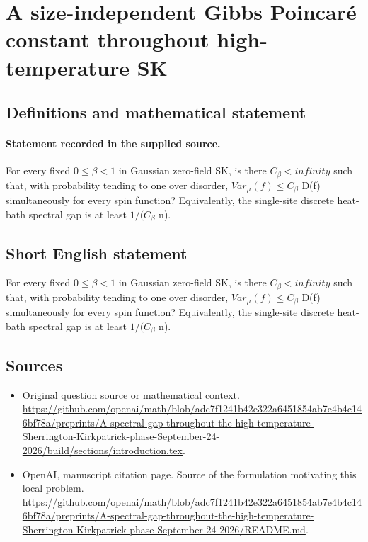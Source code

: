 \documentclass[11pt]{article}
\begin{document}
\section*{A size-independent Gibbs Poincaré constant throughout high-temperature SK}\label{statement}
\subsection{Definitions and mathematical statement}
\paragraph{Statement recorded in the supplied source.}
For every fixed $0\leq \beta <1$ in Gaussian zero-field SK, is there $C_\beta <infinity$ such that, with probability tending to one over disorder, $Var_\mu (f)\leq C_\beta $ D(f) simultaneously for every spin function? Equivalently, the single-site discrete heat-bath spectral gap is at least $1/(C_\beta $ n).
\subsection{Short English statement}
For every fixed $0\leq \beta <1$ in Gaussian zero-field SK, is there $C_\beta <infinity$ such that, with probability tending to one over disorder, $Var_\mu (f)\leq C_\beta $ D(f) simultaneously for every spin function? Equivalently, the single-site discrete heat-bath spectral gap is at least $1/(C_\beta $ n).
\subsection{Sources}
\begin{itemize}
\item[S1] Original question source or mathematical context.
\url{https://github.com/openai/math/blob/adc7f1241b42e322a6451854ab7e4b4c146bf78a/preprints/A-spectral-gap-throughout-the-high-temperature-Sherrington-Kirkpatrick-phase-September-24-2026/build/sections/introduction.tex}.
\item[S2] OpenAI, manuscript citation page. Source of the formulation motivating this local problem.
\url{https://github.com/openai/math/blob/adc7f1241b42e322a6451854ab7e4b4c146bf78a/preprints/A-spectral-gap-throughout-the-high-temperature-Sherrington-Kirkpatrick-phase-September-24-2026/README.md}.
\end{itemize}
\end{document}
